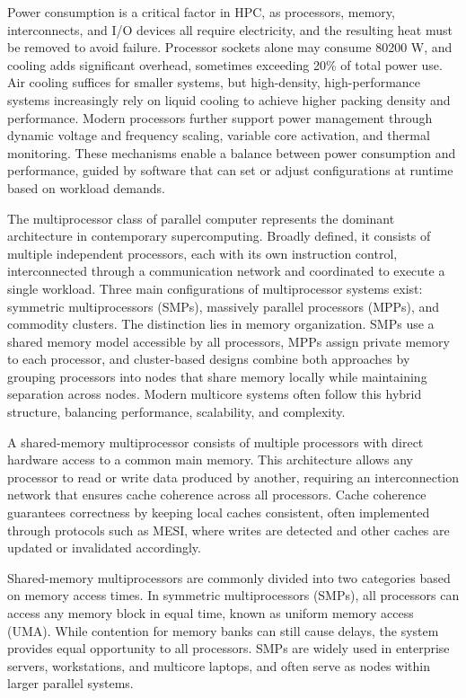 Power consumption is a critical factor in HPC, as processors, memory, interconnects, and I/O devices all require electricity, and the resulting heat must be removed to avoid failure. Processor sockets alone may consume 80200 W, and cooling adds significant overhead, sometimes exceeding 20\% of total power use. Air cooling suffices for smaller systems, but high-density, high-performance systems increasingly rely on liquid cooling to achieve higher packing density and performance. Modern processors further support power management through dynamic voltage and frequency scaling, variable core activation, and thermal monitoring. These mechanisms enable a balance between power consumption and performance, guided by software that can set or adjust configurations at runtime based on workload demands.

The multiprocessor class of parallel computer represents the dominant architecture in contemporary supercomputing. Broadly defined, it consists of multiple independent processors, each with its own instruction control, interconnected through a communication network and coordinated to execute a single workload. Three main configurations of multiprocessor systems exist: symmetric multiprocessors (SMPs), massively parallel processors (MPPs), and commodity clusters. The distinction lies in memory organization. SMPs use a shared memory model accessible by all processors, MPPs assign private memory to each processor, and cluster-based designs combine both approaches by grouping processors into nodes that share memory locally while maintaining separation across nodes. Modern multicore systems often follow this hybrid structure, balancing performance, scalability, and complexity.

A shared-memory multiprocessor consists of multiple processors with direct hardware access to a common main memory. This architecture allows any processor to read or write data produced by another, requiring an interconnection network that ensures cache coherence across all processors. Cache coherence guarantees correctness by keeping local caches consistent, often implemented through protocols such as MESI, where writes are detected and other caches are updated or invalidated accordingly.

Shared-memory multiprocessors are commonly divided into two categories based on memory access times. In symmetric multiprocessors (SMPs), all processors can access any memory block in equal time, known as uniform memory access (UMA). While contention for memory banks can still cause delays, the system provides equal opportunity to all processors. SMPs are widely used in enterprise servers, workstations, and multicore laptops, and often serve as nodes within larger parallel systems.

